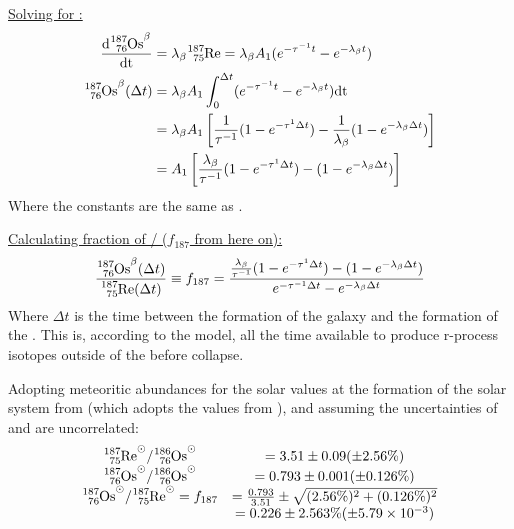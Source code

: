 \underline{Solving for :}
\begin{align*}
  \d{\os{187}^\beta} &= \lambda_\beta \re{187} = \lambda_\beta A_1 (e^{-\tau^{-1}t} - e^{-\lambda_\beta t}) \\
  \os{187}^\beta(\Delta t) &= \lambda_\beta A_1 \int_0^{\Delta t} (e^{-\tau^{-1}t} - e^{-\lambda_\beta t}) \textrm{dt} \\
  &= \lambda_\beta A_1 \left[ \frac{1}{\tau^{-1}} (1-e^{-\tau^{1}\Delta t}) - \frac{1}{\lambda_\beta} (1-e^{-\lambda_\beta \Delta t}) \right] \\
  &= A_1 \left[ \frac{\lambda_\beta}{\tau^{-1}} (1-e^{-\tau^{1}\Delta t}) - (1-e^{-\lambda_\beta \Delta t}) \right] \\
\end{align*}
Where the constants are the same as .

\newcommand\fraction{\frac{\os{187}}{\re{187}}}
\newcommand\fracfsos{f_{187}(t_{sos})}
\newcommand\fracnow{f_{187}(t_{now})}
\underline{Calculating fraction of / ($f_{187}$ from here on):}
\begin{equation}
  \label{eq:luck-fractio}
  \frac{\os{187}^\beta(\Delta t)}{\re{187}(\Delta t)} \equiv f_{187} = \frac{\frac{\lambda_\beta}{\tau^{-1}} (1-e^{-\tau^{1}\Delta t}) - (1-e^{-\lambda_\beta \Delta t})}{e^{-\tau^{-1} \Delta t} - e^{-\lambda_\beta \Delta t}}
\end{equation}
Where $\Delta t$ is the time between the formation of the galaxy and the formation of the \sos. This is, according to the model, all the time available to produce r-process isotopes outside of the \sos before collapse.

Adopting meteoritic abundances for the solar values at the formation of the solar system from  (which adopts the values from ), and assuming the uncertainties of  and  are uncorrelated:
\begin{equation}
  \label{eq:shizuma-frac}
  \begin{array}{cc}
    \re{187}^\odot/\os{186}^\odot &= 3.51 \pm 0.09 (\pm 2.56\%) \\
    \os{187}^\odot/\os{186}^\odot &= 0.793 \pm 0.001 (\pm 0.126\%) \\
    \os{187}^\odot/\re{187}^\odot = f_{187} &= \frac{0.793}{3.51} \pm \sqrt{(2.56\%)^2 + (0.126\%)^2} \\
    &= 0.226 \pm 2.563\% (\pm 5.79\times 10^{-3})
  \end{array}
\end{equation}

